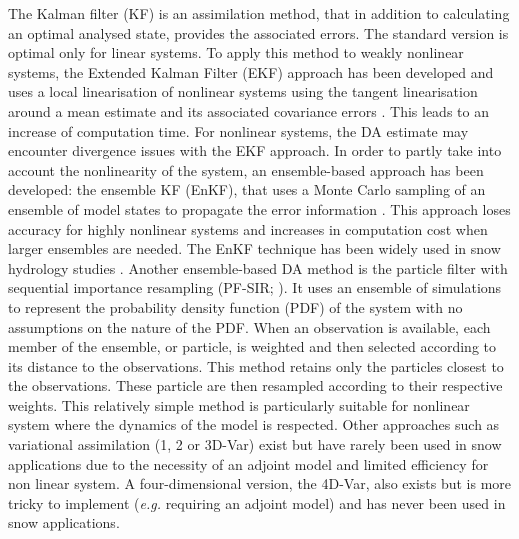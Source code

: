 \documentclass[utf8]{frontiersSCNS} %
\begin{document}
The Kalman filter (KF) is an assimilation method, that in addition to calculating an optimal analysed state, provides the associated errors. The standard version is optimal only for linear systems. To apply this method to weakly nonlinear systems, the Extended Kalman Filter (EKF) approach has been developed and uses a local linearisation of nonlinear systems using the tangent linearisation around a mean estimate and its associated covariance errors \citep{Miller_1994,Dong_2007}. This leads to an increase of computation time. 
For nonlinear systems, the DA estimate may encounter divergence issues with the EKF approach.
In order to partly take into account the nonlinearity of the system, an ensemble-based approach has been developed: the ensemble KF (EnKF), that uses a Monte Carlo sampling of an ensemble of model states to propagate the error information \citep{Burgers_1998,Evensen_2000}. This approach loses accuracy for highly nonlinear systems and increases in computation cost when larger ensembles are needed. %
The EnKF technique has been widely used in snow hydrology studies \citep[e.g.][]{Slater_2006,Andreadis_2006,Clark_2006,Su_2008,Thirel_2011,DeLannoy_2012,Huang_2017}. Another ensemble-based DA method is the particle filter with sequential importance resampling (PF-SIR; \citealp{gordon1993,Thirel_2011, Charrois_2016}). It uses an ensemble of simulations to represent the probability density function (PDF) of the system with no assumptions on the nature of the PDF. When an observation is available, each member of the ensemble, or particle, is weighted and then selected according to its distance to the observations. This method retains only the particles closest to the observations. These particle are then resampled according to their respective weights. This relatively simple method is particularly suitable for nonlinear system where the dynamics of the model is respected. Other approaches such as variational assimilation (1, 2 or 3D-Var) exist but have rarely been used in snow applications \citep{Dumont_2012} due to the necessity of an adjoint model and limited efficiency for non linear system.
A four-dimensional version, the 4D-Var, also exists but is more tricky to implement (\textit{e.g.} requiring an adjoint model) and has never been used in snow applications.
\end{document}
